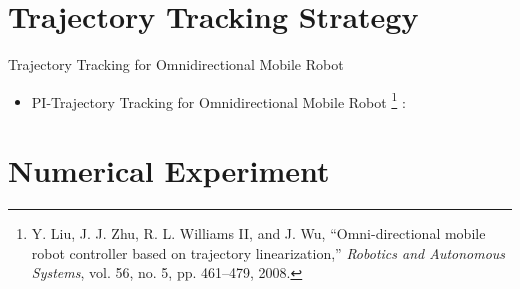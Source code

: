 \documentclass{beamer}
\begin{document}
\section{Trajectory Tracking Strategy}
\begin{frame}{Trajectory Tracking for Omnidirectional Mobile Robot}
\begin{itemize}
\item PI-Trajectory Tracking for Omnidirectional Mobile  Robot \footnote{Y. Liu, J. J. Zhu, R. L. Williams II, and J. Wu, “Omni-directional mobile robot controller based on trajectory linearization,” \emph{Robotics and Autonomous Systems}, vol. 56, no. 5, pp. 461–479, 2008.} :
\vskip 0.25cm
\end{itemize}
\end{frame}

\section{Numerical Experiment}
\end{document}
